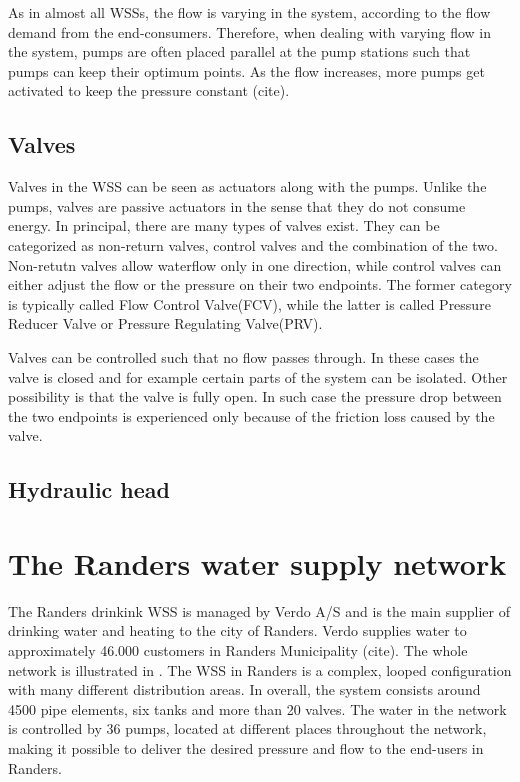 As in almost all WSSs, the flow is varying in the system, according to the flow demand from the end-consumers. Therefore, when dealing with varying flow in the system, pumps are often placed parallel at the pump stations such that pumps can keep their optimum points. As the flow increases, more pumps get activated to keep the pressure constant (cite). 

\subsection{Valves}
\label{valves}

Valves in the WSS can be seen as actuators along with the pumps. Unlike the pumps, valves are passive actuators in the sense that they do not consume energy. In principal, there are many types of valves exist. They can be categorized as non-return valves, control valves and the combination of the two. Non-retutn valves allow waterflow only in one direction, while control valves can either adjust the flow or the pressure on their two endpoints. The former category is typically called Flow Control Valve(FCV), while the latter is called Pressure Reducer Valve or Pressure Regulating Valve(PRV). 

Valves can be controlled such that no flow passes through. In these cases the valve is closed and for example certain parts of the system can be isolated. Other possibility is that the valve is fully open. In such case the pressure drop between the two endpoints is experienced only because of the friction loss caused by the valve. 

\subsection{Hydraulic head}
\label{hydraulic_head}

\section{The Randers water supply network}
\label{the_randers_water_supply_network}

The Randers drinkink WSS is managed by Verdo A/S and is the main supplier of drinking water and heating to the city of Randers. Verdo supplies water to approximately 46.000 customers in Randers Municipality (cite). The whole network is illustrated in . The WSS in Randers is a complex, looped configuration with many different distribution areas. In overall, the system consists around 4500 pipe elements, six tanks and more than 20 valves. The water in the network is controlled by 36 pumps, located at different places throughout the network, making it possible to deliver the desired pressure and flow to the end-users in Randers.

